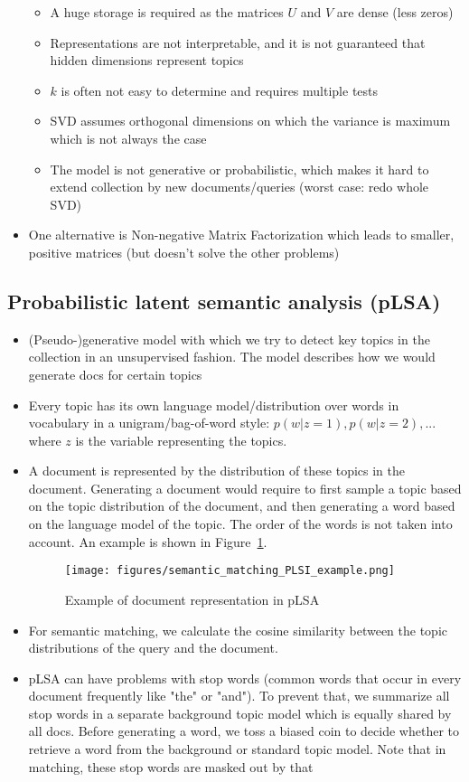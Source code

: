 \begin{itemize}
\begin{itemize}
		\item A huge storage is required as the matrices $U$ and $V$ are dense (less zeros)
		\item Representations are not interpretable, and it is not guaranteed that hidden dimensions represent topics
		\item $k$ is often not easy to determine and requires multiple tests
		\item SVD assumes orthogonal dimensions on which the variance is maximum which is not always the case
		\item The model is not generative or probabilistic, which makes it hard to extend collection by new documents/queries (worst case: redo whole SVD)
	\end{itemize}
	\item One alternative is Non-negative Matrix Factorization which leads to smaller, positive matrices (but doesn't solve the other problems)
\end{itemize}
\subsection{Probabilistic latent semantic analysis (pLSA)}
\begin{itemize}
	\item (Pseudo-)generative model with which we try to detect key topics in the collection in an unsupervised fashion. The model describes how we would generate docs for certain topics
	\item Every topic has its own language model/distribution over words in vocabulary in a unigram/bag-of-word style: $p(w|z=1), p(w|z=2),...$ where $z$ is the variable representing the topics. 
	\item A document is represented by the distribution of these topics in the document. Generating a document would require to first sample a topic based on the topic distribution of the document, and then generating a word based on the language model of the topic. The order of the words is not taken into account. An example is shown in Figure~\ref{img:semantic_matching_pLSA_example}.
	\begin{figure}[ht]
		\centering
		\texttt{[image: figures/semantic\_matching\_PLSI\_example.png]}
		\caption{Example of document representation in pLSA}
		\label{img:semantic_matching_pLSA_example}
	\end{figure}
	\item For semantic matching, we calculate the cosine similarity between the topic distributions of the query and the document.
	\item pLSA can have problems with stop words (common words that occur in every document frequently like "the" or "and"). To prevent that, we summarize all stop words in a separate background topic model which is equally shared by all docs. Before generating a word, we toss a biased coin to decide whether to retrieve a word from the background or standard topic model. Note that in matching, these stop words are masked out by that
\end{itemize}
